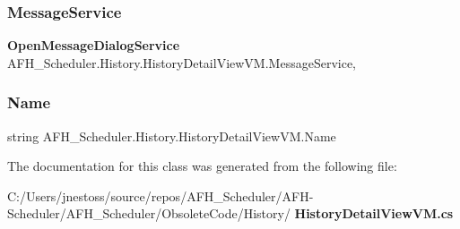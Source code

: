 \mbox{\label{class_a_f_h___scheduler_1_1_history_1_1_history_detail_view_v_m_a2f038b9c5c060b2b7c5ce2dd9ff0c0c5}} 
\subsubsection{MessageService}
{\footnotesize\ttfamily \textbf{ Open\+Message\+Dialog\+Service} A\+F\+H\+\_\+\+Scheduler.\+History.\+History\+Detail\+View\+V\+M.\+Message\+Service\hspace{0.3cm}{\ttfamily [get]}, {\ttfamily [set]}}

\mbox{\label{class_a_f_h___scheduler_1_1_history_1_1_history_detail_view_v_m_adb6eb6366e161b71daa623d5fcdf7194}} 
\subsubsection{Name}
{\footnotesize\ttfamily string A\+F\+H\+\_\+\+Scheduler.\+History.\+History\+Detail\+View\+V\+M.\+Name\hspace{0.3cm}{\ttfamily [get]}}



The documentation for this class was generated from the following file\+:\begin{DoxyCompactItemize}
\item 
C\+:/\+Users/jnestoss/source/repos/\+A\+F\+H\+\_\+\+Scheduler/\+A\+F\+H-\/\+Scheduler/\+A\+F\+H\+\_\+\+Scheduler/\+Obsolete\+Code/\+History/\textbf{ History\+Detail\+View\+V\+M.\+cs}\end{DoxyCompactItemize}

